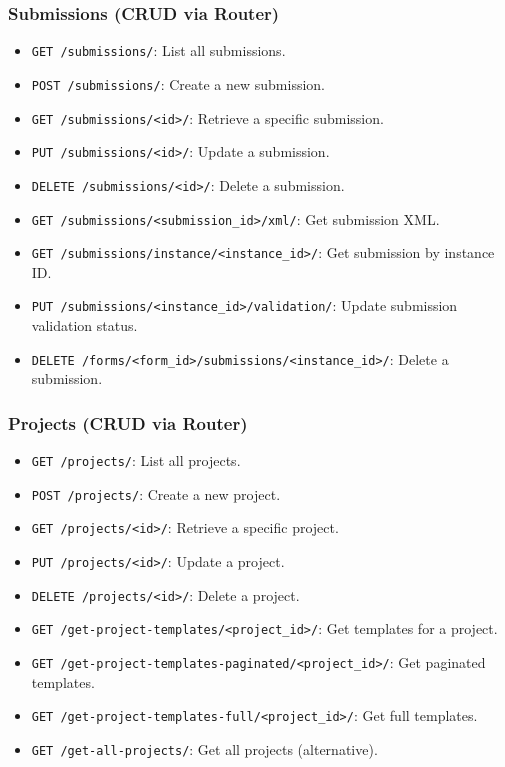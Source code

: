 \documentclass[11pt]{article}
\begin{document}
\subsubsection{Submissions (CRUD via Router)}
\begin{itemize}[leftmargin=*]
  \item \verb|GET /submissions/|: List all submissions.
  \item \verb|POST /submissions/|: Create a new submission.
  \item \verb|GET /submissions/<id>/|: Retrieve a specific submission.
  \item \verb|PUT /submissions/<id>/|: Update a submission.
  \item \verb|DELETE /submissions/<id>/|: Delete a submission.
  \item \verb|GET /submissions/<submission_id>/xml/|: Get submission XML.
  \item \verb|GET /submissions/instance/<instance_id>/|: Get submission by instance ID.
  \item \verb|PUT /submissions/<instance_id>/validation/|: Update submission validation status.
  \item \verb|DELETE /forms/<form_id>/submissions/<instance_id>/|: Delete a submission.
\end{itemize}

\subsubsection{Projects (CRUD via Router)}
\begin{itemize}[leftmargin=*]
  \item \verb|GET /projects/|: List all projects.
  \item \verb|POST /projects/|: Create a new project.
  \item \verb|GET /projects/<id>/|: Retrieve a specific project.
  \item \verb|PUT /projects/<id>/|: Update a project.
  \item \verb|DELETE /projects/<id>/|: Delete a project.
  \item \verb|GET /get-project-templates/<project_id>/|: Get templates for a project.
  \item \verb|GET /get-project-templates-paginated/<project_id>/|: Get paginated templates.
  \item \verb|GET /get-project-templates-full/<project_id>/|: Get full templates.
  \item \verb|GET /get-all-projects/|: Get all projects (alternative).
\end{itemize}
\end{document}
